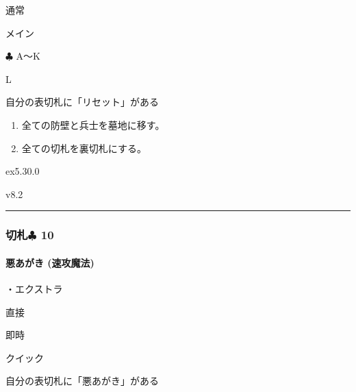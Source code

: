 \documentclass[letterpaper,10pt,dvipdfmx]{sphinxmanual}
\begin{document}
\sphinxAtStartPar
{} 通常

\sphinxAtStartPar
{} メイン

\sphinxAtStartPar
{} {\normalsize $\clubsuit$} A〜K

\sphinxAtStartPar
{} L

\sphinxAtStartPar
{}

\sphinxAtStartPar
自分の表切札に「リセット」がある

\sphinxAtStartPar
{}
\begin{enumerate}
%
\item {} 
\sphinxAtStartPar
全ての防壁と兵士を墓地に移す。

\item {} 
\sphinxAtStartPar
全ての切札を裏切札にする。

\end{enumerate}

\sphinxAtStartPar
{}  ex5.30.0

\sphinxAtStartPar
{}  v8.2


\bigskip\hrule\bigskip



\subsubsection{切札{\normalsize $\clubsuit$} 10}
\label{\detokenize{auto/frameActionlist:id78}}

\paragraph{悪あがき (速攻魔法)}
\label{\detokenize{auto/frameActionlist:act-lastditch}}\label{\detokenize{auto/frameActionlist:id79}}
\sphinxAtStartPar
{}

\sphinxAtStartPar
・エクストラ

\sphinxAtStartPar
{} 直接

\sphinxAtStartPar
{} 即時

\sphinxAtStartPar
{} クイック

\sphinxAtStartPar
{}

\sphinxAtStartPar
自分の表切札に「悪あがき」がある
\end{document}
